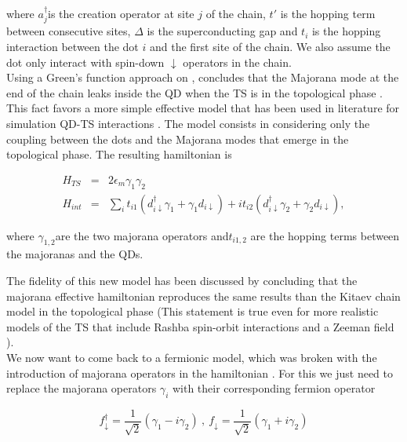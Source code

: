 where $a_{j}^{\dagger}$is the creation operator at site $j$ of the
chain, $t'$ is the hopping term between consecutive sites, $\Delta$
is the superconducting gap and $t_{i}$ is the hopping interaction
between the dot $i$ and the first site of the chain. We also assume
the dot only interact with spin-down $\downarrow$ operators in the
chain. \\

Using a Green's function approach on  ,
\citet{vernek_subtle_2014} concludes that the Majorana mode at the
end of the chain leaks inside the QD when the TS is in the topological
phase . This fact favors a more simple effective model that has been
used in literature for simulation QD-TS interactions \citep{liu_detecting_2011,golub_kondo_2011,lee_kondo_2013}.
The model consists in considering only the coupling between the dots
and the Majorana modes that emerge in the topological phase. The resulting
hamiltonian is 

\begin{eqnarray}
H_{TS} & = & 2\epsilon_{m}\gamma_{1}\gamma_{2}\nonumber \\
H_{int} & = & \sum_{i}t_{i1}\left(d_{i\downarrow}^{\dagger}\gamma_{1}+\gamma_{1}d_{i\downarrow}\right)+it_{i2}\left(d_{i\downarrow}^{\dagger}\gamma_{2}+\gamma_{2}d_{i\downarrow}\right),\label{eq:Majorana-ham}
\end{eqnarray}


where $\gamma_{1,2}$are the two majorana operators and$t_{i1,2}$
are the hopping terms between the majoranas and the QDs.

The fidelity of this new model has been discussed by \citet{ruiz-tijerina_interaction_2015}
concluding that the majorana effective hamiltonian reproduces the
same results than the Kitaev chain model in the topological phase
(This statement is true even for more realistic models of the TS that
include Rashba spin-orbit interactions and a Zeeman field \citep{ruiz-tijerina_interaction_2015}
).\\

We now want to come back to a fermionic model, which was broken with
the introduction of majorana operators in the hamiltonian .
For this we just need to replace the majorana operators $\gamma_{i}$
with their corresponding fermion operator

\[
f_{\downarrow}^{\dagger}=\frac{1}{\sqrt{2}}\left(\gamma_{1}-i\gamma_{2}\right)\ ,\ f_{\downarrow}=\frac{1}{\sqrt{2}}\left(\gamma_{1}+i\gamma_{2}\right)
\]


